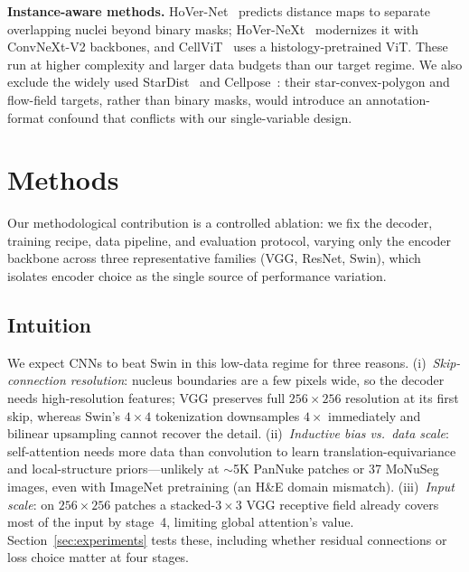 \documentclass[runningheads]{llncs}
\begin{document}
\noindent\textbf{Instance-aware methods.} HoVer-Net~\cite{graham2019hovernet} predicts distance maps to separate overlapping nuclei beyond binary masks; HoVer-NeXt~\cite{hoverneXt2023} modernizes it with ConvNeXt-V2 backbones, and CellViT~\cite{cellvit2023} uses a histology-pretrained ViT. These run at higher complexity and larger data budgets than our target regime. We also exclude the widely used StarDist~\cite{schmidt2018stardist} and Cellpose~\cite{stringer2021cellpose}: their star-convex-polygon and flow-field targets, rather than binary masks, would introduce an annotation-format confound that conflicts with our single-variable design.

\section{Methods}

Our methodological contribution is a controlled ablation: we fix the decoder, training recipe, data pipeline, and evaluation protocol, varying only the encoder backbone across three representative families (VGG, ResNet, Swin), which isolates encoder choice as the single source of performance variation.

\subsection{Intuition}
\label{sec:intuition}

We expect CNNs to beat Swin in this low-data regime for three reasons. (i)~\emph{Skip-connection resolution}: nucleus boundaries are a few pixels wide, so the decoder needs high-resolution features; VGG preserves full $256\times256$ resolution at its first skip, whereas Swin's $4\times4$ tokenization downsamples $4\times$ immediately and bilinear upsampling cannot recover the detail. (ii)~\emph{Inductive bias vs.\ data scale}: self-attention needs more data than convolution to learn translation-equivariance and local-structure priors---unlikely at ${\sim}$5K PanNuke patches or 37 MoNuSeg images, even with ImageNet pretraining (an H\&E domain mismatch). (iii)~\emph{Input scale}: on $256\times256$ patches a stacked-$3\times3$ VGG receptive field already covers most of the input by stage~4, limiting global attention's value. Section~\ref{sec:experiments} tests these, including whether residual connections or loss choice matter at four stages.
\end{document}
